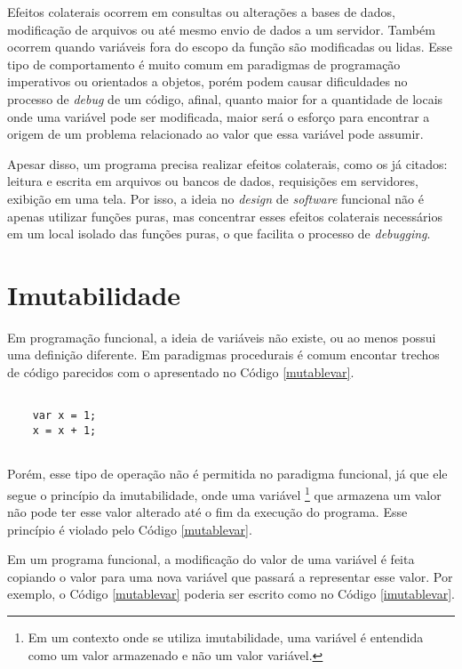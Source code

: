 Efeitos colaterais ocorrem em consultas ou 
alterações a bases de dados, modificação de 
arquivos ou até mesmo envio de dados a um 
servidor\cite{purefunctionscala, functionalscala}. 
Também ocorrem quando variáveis fora 
do escopo da função são modificadas ou lidas. 
Esse tipo de comportamento é muito comum em 
paradigmas de programação imperativos ou 
orientados a objetos, porém 
podem causar dificuldades no processo de 
\textit{debug} de um código, afinal, 
quanto maior for a quantidade de locais onde 
uma variável pode ser modificada, maior 
será o esforço para encontrar a origem de 
um problema relacionado ao valor que essa 
variável pode assumir.

Apesar disso, um programa precisa realizar 
efeitos colaterais, como os já citados: 
leitura e escrita em arquivos ou bancos de 
dados, requisições em servidores, exibição em 
uma tela. Por isso, a ideia no \textit{design} de 
\textit{software} funcional não é apenas utilizar 
funções puras, mas concentrar esses efeitos 
colaterais necessários em um local isolado das 
funções puras, o que facilita o 
processo de \textit{debugging}\cite{purefunctionscala}.



\section{Imutabilidade}

Em programação funcional, a ideia de variáveis não 
existe, ou ao menos possui uma definição diferente\cite{braveclojure}.
Em paradigmas procedurais é comum encontar trechos 
de código parecidos com o apresentado no Código \ref{mutablevar}.

\begin{lstlisting}[caption={Exemplo de Código Mutável.},label=mutablevar]

    var x = 1;
    x = x + 1;


\end{lstlisting}

Porém, esse tipo de operação não é permitida no 
paradigma funcional, já que ele segue o princípio 
da imutabilidade, onde uma variável \footnote{
Em um contexto onde se utiliza imutabilidade, uma 
variável é entendida como um valor armazenado 
e não um valor variável.} que armazena um valor 
não pode ter esse valor alterado até o fim da 
execução do programa. Esse princípio é violado  
pelo Código \ref{mutablevar}.

Em um programa funcional, a modificação do valor 
de uma variável é feita copiando o valor para uma 
nova variável que passará a representar esse valor\cite{functionalscala}.
Por exemplo, o Código \ref{mutablevar} poderia ser 
escrito como no Código \ref{imutablevar}.

